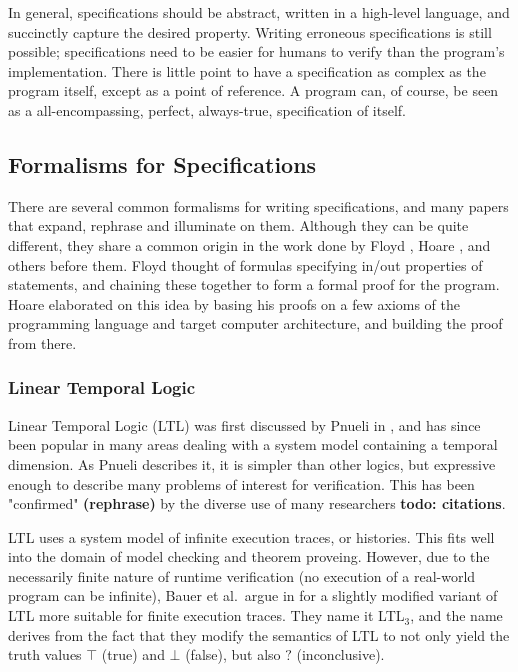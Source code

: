 \documentclass[a4paper,11pt]{kth-mag}
\newcommand{\todo}[1]{\textbf{todo: #1}}
\newcommand{\rephrase}{\textbf{(rephrase)} }
\begin{document}
In general, specifications should be abstract, written in a high-level
language, and succinctly capture the desired property. Writing erroneous
specifications is still possible; specifications need to be easier for humans
to verify than the program's implementation. There is little point to have a
specification as complex as the program itself, except as a point of reference.
A program can, of course, be seen as a all-encompassing, perfect, always-true,
specification of itself.



\subsection{Formalisms for Specifications}

There are several common formalisms for writing specifications, and many papers
that expand, rephrase and illuminate on them. Although they can be quite
different, they share a common origin in the work done by Floyd \cite{floyd67},
Hoare \cite{hoare69}, and others before them.  Floyd thought of formulas
specifying in/out properties of statements, and chaining these together to form
a formal proof for the program. Hoare elaborated on this idea by basing his
proofs on a few axioms of the programming language and target computer
architecture, and building the proof from there.

\subsubsection{Linear Temporal Logic}

Linear Temporal Logic (LTL) was first discussed by Pnueli in \cite{pnueli77},
and has since been popular in many areas dealing with a system model containing
a temporal dimension. As Pnueli describes it, it is simpler than other logics,
but expressive enough to describe many problems of interest for verification.
This has been "confirmed" \rephrase by the diverse use of many researchers
\todo{citations}.

LTL uses a system model of infinite execution traces, or histories. This fits
well into the domain of model checking and theorem proveing. However, due to
the necessarily finite nature of runtime verification (no execution of a
real-world program can be infinite), Bauer et al.\ argue in
\cite{bauer07rvltl,bauer06monitoring} for a slightly modified variant of LTL
more suitable for finite execution traces. They name it LTL$_3$, and the name
derives from the fact that they modify the semantics of LTL to not only yield
the truth values $\top$ (true) and $\bot$ (false), but also $?$ (inconclusive).
\end{document}
